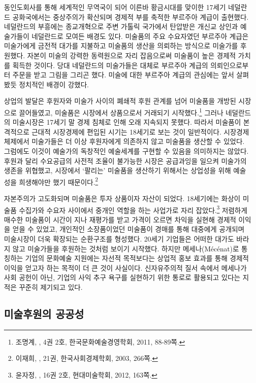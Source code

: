 동인도회사를 통해 세계적인 무역국이 되어 이른바 황금시대를 맞이한 17세기 네덜란드 공화국에서는 중상주의가 확산되며 경제적 부를 축적한 부르주아 계급이 출현했다. 네덜란드의 부흥에는 종교개혁으로 주변 가톨릭 국가에서 탄압받은 개신교 상인과 예술가들이 네덜란드로 모여든 배경도 있다. 미술품의 주요 수요자였던 부르주아 계급은 미술가에게 금전적 대가를 지불하고 미술품의 생산을 의뢰하는 방식으로 미술가를 후원했다. 자본이 미술의 강력한 동력원으로 자리 잡음으로써 미술품이 높은 경제적 가치를 획득한 것이다. 당대 네덜란드의 미술가들은 대체로 부르주아 계급의 의뢰인으로부터 주문을 받고 그림을 그리곤 했다. 미술에 대한 부르주아 계급의 관심에는 앞서 살펴봤듯 정치적인 배경이 강했다.

상업의 발달은 후원자와 미술가 사이의 폐쇄적 후원 관계를 넘어 미술품을 개방된 시장으로 끌어들였고, 미술품은 시장에서 상품으로서 거래되기 시작했다.\footnote{조명계, ,  4권 2호, 한국문화예술경영학회, 2011, 88-89쪽.} 그러나 네덜란드의 미술시장은 17세기 말 경제 침체로 인해 오래 지속되지 못했다. 따라서 미술품이 본격적으로 근대적 시장경제에 편입된 시기는 18세기로 보는 것이 일반적이다. 시장경제 체제에서 미술가들은 더 이상 후원자에게 의존하지 않고 미술품을 생산할 수 있었다. 그럼에도 이것이 예술가의 독창적인 예술세계를 구현할 수 있음을 의미하지는 않았다. 후원과 달리 수요공급의 사전적 조율이 불가능한 시장은 공급과잉을 일으켜 미술가의 생존을 위협했고, 시장에서 `팔리는' 미술품을 생산하기 위해서는 상업성을 위해 예술성을 희생해야만 했기 때문이다.\footnote{이재희, ,  21권, 한국사회경제학회, 2003, 266쪽.}

자본주의가 고도화되며 미술품은 투자 상품이자 자산이 되었다. 18세기에는 화상이 미술품 수집가와 수요자 사이에서 중개인 역할을 하는 사업가로 자리 잡았다.\footnote{윤자정, ,  16권 2호, 현대미술학회, 2012, 163쪽.} 저렴하게 매수한 미술품이 시간이 지나 재평가를 받고 가격이 오르면 차익을 실현해 경제적 이익을 얻을 수 있었고, 개인적인 소장품이었던 미술품이 경매를 통해 대중에게 공개되며 미술시장이 더욱 확장되는 순환구조를 형성했다. 20세기 기업들은 어떠한 대가도 바라지 않고 미술가들을 후원하는 것처럼 보이기 시작했다. 하지만 메세나(Mécénat)로 통칭하는 기업의 문화예술 지원에는 자선적 목적보다는 상업적 홍보 효과를 통해 경제적 이익을 얻고자 하는 목적이 더 큰 것이 사실이다. 신자유주의적 질서 속에서 메세나가 사회 공헌이 아닌, 기업의 사익 추구 욕구를 실현하기 위한 통로로 활용되고 있다는 지적은 꾸준히 제기되고 있다.

\subsection{미술후원의 공공성}

